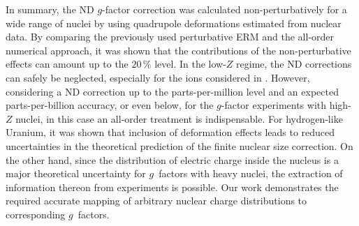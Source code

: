 In summary, the ND $g$-factor correction was calculated non-perturbatively for a wide range of nuclei by using quadrupole deformations estimated from nuclear data.
By comparing the previously used perturbative ERM and the all-order numerical approach, it was shown that the contributions of the non-perturbative effects can amount up to the $20\,\%$ level.
In the low-$Z$ regime, the ND corrections can safely be neglected, especially for the ions considered in \cite{Sturm2014}. However, considering a ND correction up to the parts-per-million level and an expected parts-per-billion accuracy, or even below, for the $g$-factor experiments with high-$Z$ nuclei, in this case an all-order treatment is indispensable. 
For hydrogen-like Uranium, it was shown that inclusion of deformation effects leads to reduced uncertainties in the theoretical prediction of the finite nuclear size correction.
On the other hand, since the distribution of electric charge inside the nucleus is a major theoretical uncertainty for $g$~factors with heavy nuclei, the extraction of information thereon from experiments is possible. Our work demonstrates the required accurate mapping of arbitrary nuclear charge distributions to corresponding $g$~factors.%
\clearpage
%
